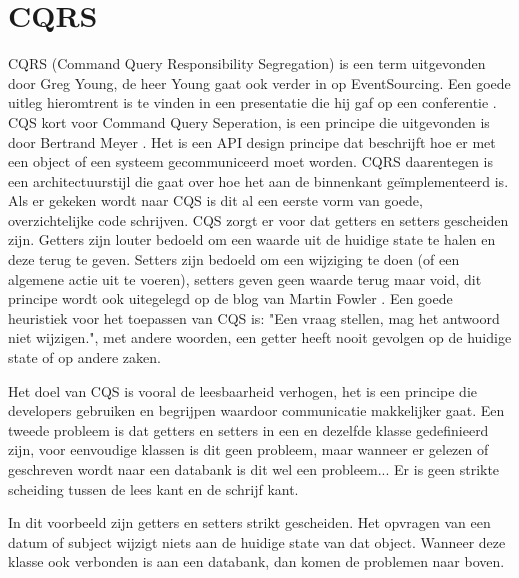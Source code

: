 
\chapter{CQRS}
\label{ch:CQRS}

CQRS (Command Query Responsibility Segregation) is een term uitgevonden door Greg Young, de heer Young gaat ook verder in op EventSourcing. Een goede uitleg hieromtrent is te vinden in een presentatie die hij gaf op een conferentie \autocite{Young2014CQRSandES}. CQS kort voor Command Query Seperation, is een principe die uitgevonden is door Bertrand Meyer \autocite{Meyer1988}. Het is een API design principe dat beschrijft hoe er met een object of een systeem gecommuniceerd moet worden. CQRS daarentegen is een architectuurstijl die gaat over hoe het aan de binnenkant geïmplementeerd is. Als er gekeken wordt naar CQS is dit al een eerste vorm van goede, overzichtelijke code schrijven. CQS zorgt er voor dat getters en setters gescheiden zijn. Getters zijn louter bedoeld om een waarde uit de huidige state te halen en deze terug te geven. Setters zijn bedoeld om een wijziging te doen (of een algemene actie uit te voeren), setters geven geen waarde terug maar void, dit principe wordt ook uitegelegd op de blog van Martin Fowler \autocite{Fowler2005CQS}. Een goede heuristiek voor het toepassen van CQS is: "Een vraag stellen, mag het antwoord niet wijzigen.", met andere woorden, een getter heeft nooit gevolgen op de huidige state of op andere zaken.

Het doel van CQS is vooral de leesbaarheid verhogen, het is een principe die developers gebruiken en begrijpen waardoor communicatie makkelijker gaat.
Een tweede probleem is dat getters en setters in een en dezelfde klasse gedefinieerd zijn, voor eenvoudige klassen is dit geen probleem, maar wanneer er gelezen of geschreven wordt naar een databank is dit wel een probleem... Er is geen strikte scheiding tussen de lees kant en de schrijf kant.


In dit voorbeeld zijn getters en setters strikt gescheiden. Het opvragen van een datum of subject wijzigt niets aan de huidige state van dat object. Wanneer deze klasse ook verbonden is aan een databank, dan komen de problemen naar boven.

